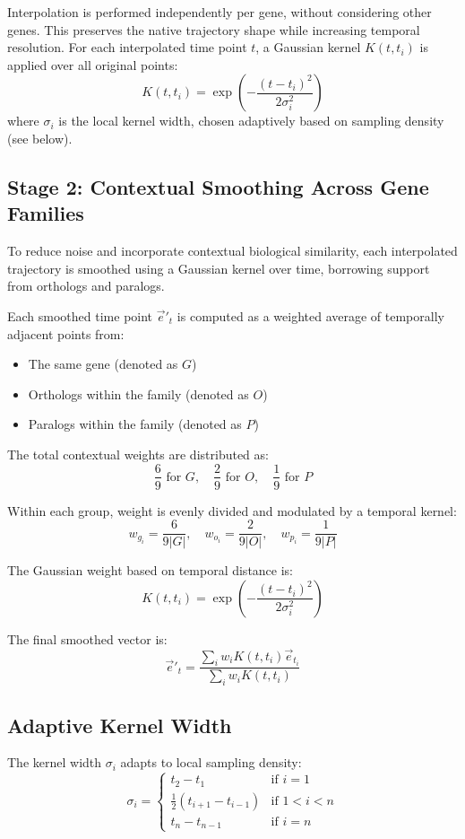 \documentclass{article}
\begin{document}
Interpolation is performed independently per gene, without considering other genes. This preserves the native trajectory shape while increasing temporal resolution. For each interpolated time point \( t \), a Gaussian kernel \( K(t, t_i) \) is applied over all original points:
\[
K(t, t_i) = \exp\left( -\frac{(t - t_i)^2}{2\sigma_i^2} \right)
\]
where \( \sigma_i \) is the local kernel width, chosen adaptively based on sampling density (see below).

\subsection{Stage 2: Contextual Smoothing Across Gene Families}

To reduce noise and incorporate contextual biological similarity, each interpolated trajectory is smoothed using a Gaussian kernel over time, borrowing support from orthologs and paralogs.

Each smoothed time point \( \vec{e}'_t \) is computed as a weighted average of temporally adjacent points from:
\begin{itemize}
  \item The same gene (denoted as \( G \))
  \item Orthologs within the family (denoted as \( O \))
  \item Paralogs within the family (denoted as \( P \))
\end{itemize}

The total contextual weights are distributed as:
\[
\frac{6}{9} \text{ for } G, \quad
\frac{2}{9} \text{ for } O, \quad
\frac{1}{9} \text{ for } P
\]

Within each group, weight is evenly divided and modulated by a temporal kernel:
\[
w_{g_i} = \frac{6}{9|G|}, \quad
w_{o_i} = \frac{2}{9|O|}, \quad
w_{p_i} = \frac{1}{9|P|}
\]

The Gaussian weight based on temporal distance is:
\[
K(t, t_i) = \exp\left( -\frac{(t - t_i)^2}{2\sigma_i^2} \right)
\]

The final smoothed vector is:
\[
\vec{e}'_t = \frac{\sum_i w_i K(t, t_i) \vec{e}_{t_i}}{\sum_i w_i K(t, t_i)}
\]

\subsection{Adaptive Kernel Width}

The kernel width \( \sigma_i \) adapts to local sampling density:
\[
\sigma_i =
\begin{cases}
t_2 - t_1 & \text{if } i = 1 \\
\frac{1}{2}(t_{i+1} - t_{i-1}) & \text{if } 1 < i < n \\
t_n - t_{n-1} & \text{if } i = n
\end{cases}
\]
\end{document}
